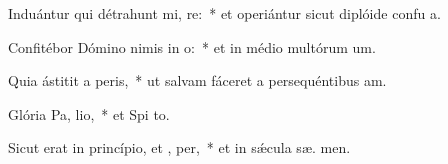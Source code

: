 \item Induántur qui détrahunt mi, re:~* et operiántur sicut diplóide confu a.
\item Confitébor Dómino nimis in  o:~* et in médio multórum  um.
\item Quia ástitit a  peris,~* ut salvam fáceret a persequéntibus  am.
\item Glória Pa,  lio,~* et Spi to.
\item Sicut erat in princípio, et ,  per,~* et in sǽcula sæ. men.
